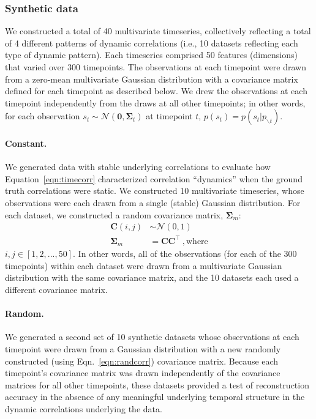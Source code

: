 \documentclass[english]{article}
\begin{document}
\subsubsection*{Synthetic data}
We constructed a total of 40 multivariate timeseries, collectively
reflecting a total of 4 different patterns of dynamic correlations
(i.e., 10 datasets reflecting each type of dynamic pattern).  Each
timeseries comprised 50 features (dimensions) that varied over 300
timepoints.  The observations at each timepoint were drawn from a
zero-mean multivariate Gaussian distribution with a covariance matrix
defined for each timepoint as described below.  We drew the observations at
each timepoint independently from the draws at all other timepoints;
in other words, for each observation $s_t \sim
\mathcal{N}\left(\mathbf{0}, \mathbf{\Sigma}_t\right)$ at timepoint $t$, $p(s_t) = p(s_t | p_{\backslash t})$.

\paragraph*{Constant.}  We generated data with stable underlying
correlations to evaluate how Equation~\ref{eqn:timecorr} characterized
correlation ``dynamics'' when the ground truth correlations were
static.  We constructed 10 multivariate timeseries, whose observations
were each drawn from a single (stable) Gaussian distribution.  For
each dataset, we constructed a random covariance matrix,
$\mathbf{\Sigma}_m$:
\begin{align}
  \mathbf{C}(i, j) &\sim \mathcal{N}(0, 1)\\
  \mathbf{\Sigma}_m &= \mathbf{C}
                                          \mathbf{C}^\top~\mathrm{, where}\label{eqn:randcorr}
  \end{align}
  $i, j \in \left[1, 2, ..., 50 \right]$.  In other words, all of the
  observations (for each of the 300 timepoints) within each dataset
  were drawn from a multivariate Gaussian distribution with the same
  covariance matrix, and the 10 datasets each used a different
  covariance matrix.
  
  \paragraph*{Random.}  We generated a second set of 10 synthetic
  datasets whose observations at each timepoint were drawn from a
  Gaussian distribution with a new randomly constructed (using
  Eqn.~\ref{eqn:randcorr}) covariance matrix.  Because each
  timepoint's covariance matrix was drawn independently of the
  covariance matrices for all other timepoints, these datasets
  provided a test of reconstruction accuracy in the absence of any
  meaningful underlying temporal structure in the dynamic correlations
  underlying the data.
  
\end{document}
